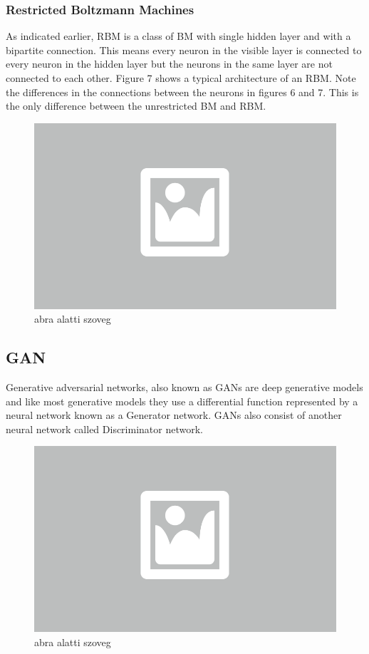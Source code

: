 \subsubsection{Restricted Boltzmann Machines}

As indicated earlier, RBM is a class of BM with single hidden layer and with a bipartite connection. This means every neuron in the visible layer is connected to every neuron in the hidden layer but the neurons in the same layer are not connected to each other. Figure 7 shows a typical architecture of an RBM. Note the differences in the connections between the neurons in figures 6 and 7. This is the only difference between the unrestricted BM and RBM.

\begin{figure}[ht]
	\centering
	\includegraphics[width=0.65\columnwidth]{figures/abra.png}
	\caption{abra alatti szoveg}
\end{figure}


\subsection{GAN}

Generative adversarial networks, also known as GANs are deep generative models and like most generative models they use a differential function represented by a neural network known as a Generator network. GANs also consist of another neural network called Discriminator network.

\begin{figure}[ht]
	\centering
	\includegraphics[width=0.65\columnwidth]{figures/abra.png}
	\caption{abra alatti szoveg}
\end{figure}

